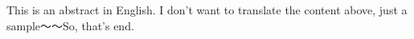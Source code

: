 
\begin{abstract}

这篇文章是这个\LaTeX{}~模板的测试，我顺便写一点关于这个模板的用法。就像你现在看到的，这是一个摘要。

依据学校给的要求（已经放在附录A里了），章标题要求黑体，三号，居中；节标题要求四号，居中；其他各级标题都是小四号，黑体，居左；正文小四号，宋体，中文段落空两个字。

大概就是这些，关键字要求3-5个，中间用空格分开。

\end{abstract}

\begin{enabstract}

This is an abstract in English. I don't want to translate the content above, just a sample～～So, that's end. 


\end{enabstract}
